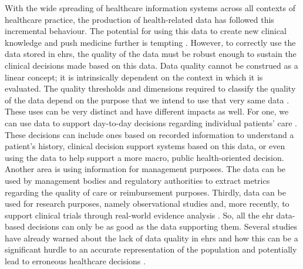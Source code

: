 With the wide spreading of healthcare information systems across all contexts of healthcare practice, the production of health-related data has followed this incremental behaviour. The potential for using this data to create new clinical knowledge and push medicine further is tempting \cite{martin-sanchezBigDataMedicine2014}.
However, to correctly use the data stored in \acp{ehr}, the quality of the data must be robust enough to sustain the clinical decisions made based on this data. Data quality cannot be construed as a linear concept; it is intrinsically dependent on the context in which it is evaluated. The quality thresholds and dimensions required to classify the quality of the data depend on the purpose that we intend to use that very same data \cite{waljiElectronicHealthRecords2019}. These uses can be very distinct and have different impacts as well. For one, we can use data to support day-to-day decisions regarding individual patients’ care \cite{verheijPossibleSourcesBias2018}. These decisions can include ones based on recorded information to understand a patient’s history, clinical decision support systems based on this data, or even using the data to help support a more macro, public health-oriented decision. Another area is using information for management purposes. The data can be used by management bodies and regulatory authorities to extract metrics regarding the quality of care or reimbursement purposes. Thirdly, data can be used for research purposes, namely observational studies and, more recently, to support clinical trials through real-world evidence analysis \cite{coreyAssessingQualitySurgical2020,verheijPossibleSourcesBias2018,wengClinicalDataQuality2020}. 
So, all the \ac{ehr} data-based decisions can only be as good as the data supporting them. Several studies have already warned about the lack of data quality in \acp{ehr} and how this can be a significant hurdle to an accurate representation of the population and potentially lead to erroneous healthcare decisions \cite{reimerDataQualityAssessment2016a,joukesImpactElectronicPaperBased2019a,huserMultisiteEvaluationData2016,zhangUnderstandingDetectingDefects2020,kramerImpactDataQuality2021,gigantiImpactDataQuality2019}.

